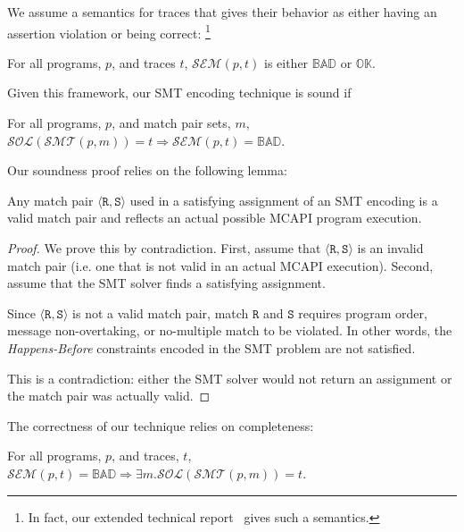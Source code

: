 We assume a semantics for traces that gives their behavior as either
having an assertion violation or being correct: \footnote{In fact, our
  extended technical report~\cite{extended-version} gives such a
  semantics.}

\begin{definition}[Semantics]
For all programs, $p$, and traces $t$, $\mathcal{SEM}(p, t)$ is either
$\mathbb{BAD}$ or $\mathbb{OK}$.
\end{definition}

Given this framework, our SMT encoding technique is sound if

\begin{theorem}[Soundness]
For all programs, $p$, and match pair sets, $m$,
$\mathcal{SOL}(\mathcal{SMT}(p, m)) = t \Rightarrow \mathcal{SEM}(p, t) =
\mathbb{BAD}$.
\end{theorem}

Our soundness proof relies on the following lemma:

\begin{lemma} \label{lem:bogus}
Any match pair $\langle \mathtt{R}, \mathtt{S}\rangle$ used in a
satisfying assignment of an SMT encoding is a valid match pair and
reflects an actual possible MCAPI program execution.
\end{lemma}
\begin{proof}
We prove this by contradiction. First, assume that $\langle
\mathtt{R}, \mathtt{S}\rangle$ is an invalid match pair (i.e. one that
is not valid in an actual MCAPI execution). Second, assume that the
SMT solver finds a satisfying assignment.

Since $\langle \mathtt{R}, \mathtt{S}\rangle$ is not a valid match
pair, match $\mathtt{R}$ and $\mathtt{S}$ requires program order,
message non-overtaking, or no-multiple match to be violated. In other
words, the \emph{Happens-Before} constraints encoded in the SMT
problem are not satisfied.

This is a contradiction: either the SMT solver would not return an
assignment or the match pair was actually valid.
\end{proof}

The correctness of our technique relies on completeness:

\begin{theorem}[Completeness]
For all programs, $p$, and traces, $t$, $\mathcal{SEM}(p, t) =
\mathbb{BAD} \Rightarrow \exists m . \mathcal{SOL}(\mathcal{SMT}(p,
m)) = t$.
\end{theorem}

